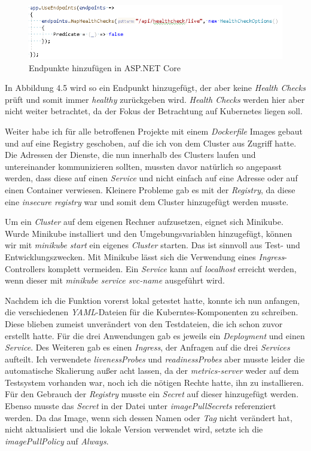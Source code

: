 \documentclass[12pt,a4paper]{scrartcl}
\begin{document}
\begin{figure}[h!]
	\centering
	\includegraphics[scale=1]{CsEndpoint.png}
	\caption[Screenshot]{Endpunkte hinzufügen in ASP.NET Core}
\end{figure}

In Abbildung 4.5 wird so ein Endpunkt hinzugefügt, der aber keine \emph{Health Checks} prüft und somit immer \emph{healthy} zurückgeben wird. \emph{Health Checks} werden hier aber nicht weiter betrachtet, da der Fokus der Betrachtung auf Kubernetes liegen soll.

Weiter habe ich für alle betroffenen Projekte mit einem \emph{Dockerfile} Images gebaut und auf eine Registry geschoben, auf die ich von dem Cluster aus Zugriff hatte. Die Adressen der Dienste, die nun innerhalb des Clusters laufen und untereinander kommunizieren sollten, mussten davor natürlich so angepasst werden, dass diese auf einen \emph{Service} und nicht einfach auf eine Adresse oder auf einen Container verwiesen. Kleinere Probleme gab es mit der \emph{Registry}, da diese eine \emph{insecure registry} war und somit dem Cluster hinzugefügt werden musste.

Um ein \emph{Cluster} auf dem eigenen Rechner aufzusetzen, eignet sich Minikube. Wurde Minikube installiert und den Umgebungsvariablen hinzugefügt, können wir mit \emph{minikube start} ein eigenes \emph{Cluster} starten. Das ist sinnvoll aus Test- und Entwicklungszwecken. Mit Minikube lässt sich die Verwendung eines \emph{Ingress}-Controllers komplett vermeiden. Ein \emph{Service} kann auf \emph{localhost} erreicht werden, wenn dieser mit \emph{minikube service svc-name} ausgeführt wird. 

Nachdem ich die Funktion vorerst lokal getestet hatte, konnte ich nun anfangen, die verschiedenen \emph{YAML}-Dateien für die Kuberntes-Komponenten zu schreiben. Diese blieben zumeist unverändert von den Testdateien, die ich schon zuvor erstellt hatte. Für die drei Anwendungen gab es jeweils ein \emph{Deployment} und einen \emph{Service}. Des Weiteren gab es einen \emph{Ingress}, der Anfragen auf die drei \emph{Services} aufteilt. Ich verwendete \emph{livenessProbes} und \emph{readinessProbes} aber musste leider die automatische Skalierung außer acht lassen, da der \emph{metrics-server} weder auf dem Testsystem vorhanden war, noch ich die nötigen Rechte hatte, ihn zu installieren. Für den Gebrauch der \emph{Registry} musste ein \emph{Secret} auf dieser hinzugefügt werden. Ebenso musste das \emph{Secret} in der Datei unter \emph{imagePullSecrets} referenziert werden. Da das Image, wenn sich dessen Namen oder \emph{Tag} nicht verändert hat, nicht aktualisiert und die lokale Version verwendet wird, setzte ich die \emph{imagePullPolicy} auf \emph{Always}.
\end{document}
